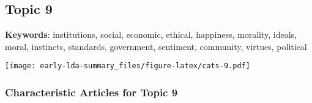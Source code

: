 \documentclass[
]{article}
\begin{document}
\newpage

\hypertarget{topic-9}{%
\subsection{Topic 9}\label{topic-9}}

\textbf{Keywords}: institutions, social, economic, ethical, happiness,
morality, ideals, moral, instincts, standards, government, sentiment,
community, virtues, political

\texttt{[image: early-lda-summary\_files/figure-latex/cats-9.pdf]}
\newpage 

\hypertarget{characteristic-articles-for-topic-9}{%
\subsubsection{Characteristic Articles for Topic
9}\label{characteristic-articles-for-topic-9}}
\end{document}

